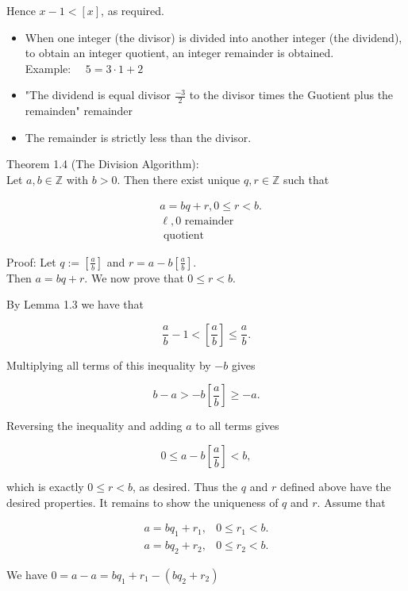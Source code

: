 \documentclass[10pt]{article}
\begin{document}
Hence $x-1<[x]$, as required.

\begin{itemize}
  \item When one integer (the divisor) is divided into another integer (the dividend), to obtain an integer quotient, an integer remainder is obtained.\\
Example: $\quad 5=3 \cdot 1+2$
  \item "The dividend is equal divisor $\frac{-3}{2}$ to the divisor times the Guotient plus the remainden" remainder
  \item The remainder is strictly less than the divisor.
\end{itemize}

Theorem 1.4 (The Division Algorithm):\\
Let $a, b \in \mathbb{Z}$ with $b>0$. Then there exist unique $q, r \in \mathbb{Z}$ such that

$$
\begin{aligned}
& a=b q+r, 0 \leq r<b . \\
& \ell, 0 \text { remainder } \\
& \text { quotient }
\end{aligned}
$$

Proof: Let $q:=\left[\frac{a}{b}\right]$ and $r=a-b\left[\frac{a}{b}\right]$.\\
Then $a=b q+r$. We now prove that $0 \leqslant r<b$.

By Lemma 1.3 we have that

$$
\frac{a}{b}-1<\left[\frac{a}{b}\right] \leqslant \frac{a}{b} .
$$

Multiplying all terms of this inequality by $-b$ gives

$$
b-a>-b\left[\frac{a}{b}\right] \geqslant-a .
$$

Reversing the inequality and adding $a$ to all terms gives

$$
0 \leqslant a-b\left[\frac{a}{b}\right]<b,
$$

which is exactly $0 \leqslant r<b$, as desired. Thus the $q$ and $r$ defined above have the desired properties. It remains to show the uniqueness of $q$ and $r$. Assume that

$$
\begin{array}{ll}
a=b q_{1}+r_{1}, & 0 \leqslant r_{1}<b . \\
a=b q_{2}+r_{2}, & 0 \leqslant r_{2}<b .
\end{array}
$$

We have $0=a-a=b q_{1}+r_{1}-\left(b q_{2}+r_{2}\right)$
\end{document}
